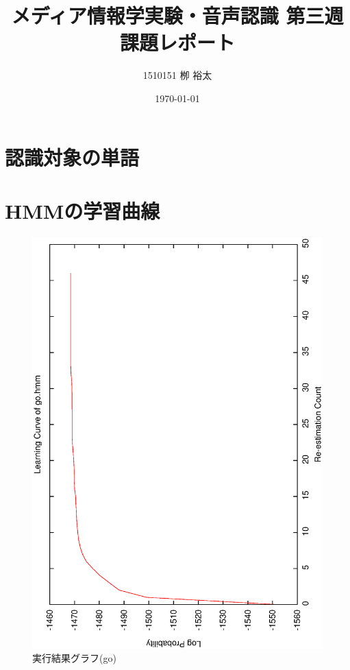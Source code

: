 \documentclass[11pt,a4paper, uplatex]{jsarticle}
\title{メディア情報学実験・音声認識 第三週課題レポート}
\author{1510151  栁 裕太}
\date{\today}
\begin{document}
\maketitle
\section{認識対象の単語}

\section{HMMの学習曲線}

\begin{figure}[h]
  \begin{center}
    \includegraphics[width=13.0cm]{learningCurve.ps}
    \caption{実行結果グラフ(go)}
    \label{fig:ps}
  \end{center}
\end{figure}
\end{document}
